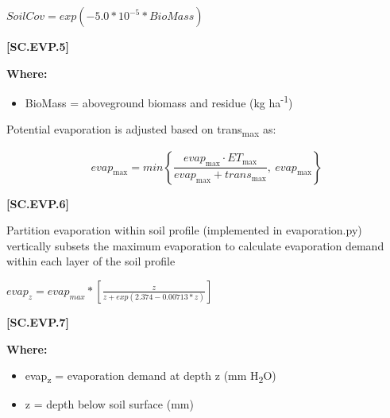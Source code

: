     \begin{center}
 \(SoilCov=exp(-5.0 * 10^{-5} * BioMass)	\)
    \end{center}
        \vspace{0.5cm} 
    
            {\raggedleft \textbf{[SC.EVP.5]}\par}
            \vspace{0.5cm}

        \textbf{Where:}
            
        \begin{itemize}
            \item BioMass = aboveground biomass and residue (kg ha\textsuperscript{-1}) 
        \end{itemize}
    \vspace{0.2cm}

Potential evaporation is adjusted based on trans\textsubscript{max} as: 
    \vspace{0.2cm}

    \begin{center}

\[
evap_{\text{max}} = min\left\{ \frac{evap_{\text{max}} \cdot ET_{\text{max}}}{evap_{\text{max}} + trans_{\text{max}}},\ evap_{\text{max}} \right\}
\]


    \end{center}
        \vspace{0.5cm} 
    
            {\raggedleft \textbf{[SC.EVP.6]}\par}
            \vspace{0.5cm}

Partition evaporation within soil profile (implemented in evaporation.py) vertically subsets the maximum evaporation to calculate evaporation demand within each layer of the soil profile
\vspace{0.5cm}

    \begin{center}
 \(evap_z=evap_{max} * [\frac{z}{z + exp(2.374-0.00713* z)}]\)
    \end{center}
        \vspace{0.5cm} 
    
            {\raggedleft \textbf{[SC.EVP.7]}\par}
            \vspace{0.5cm}

        \textbf{Where:}
            
        \begin{itemize}
            \item evap\textsubscript{z}	=	evaporation demand at depth z (mm H\textsubscript{2}O)
            \item z	=	depth below soil surface (mm)
        \end{itemize}
    \vspace{0.2cm}

